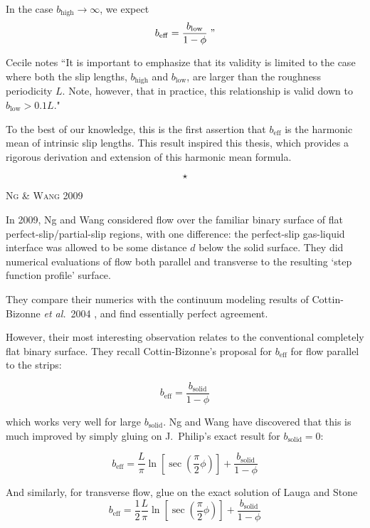 \documentclass[a4paper]{report}
\newcommand{\beff}{\ensuremath{b_{\mathrm{eff}}}}
\newcommand{\bhigh}{\ensuremath{b_{\mathrm{high}}}}
\newcommand{\blow}{\ensuremath{b_{\mathrm{low}}}}
\newcommand{\sep}{\begin{equation*} \star \end{equation*}}
\newcommand{\paper}[1]
         {\colorbox[gray]{0.8}{ \textsc{#1}}
         
         }
\begin{document}
In the case $b_{\mathrm{high}} \rightarrow \infty$, we expect
\begin{equation*}
\beff = \frac{b_{\mathrm{low}}}{1-\phi} \;"
\end{equation*}

Cecile notes ``It is important to emphasize that its validity is limited to the case where both the slip lengths, $\bhigh$ and $\blow$, are larger than the roughness periodicity $L$. Note, however, that in practice, this relationship is valid down to $\blow > 0.1L$."

To the best of our knowledge, this is the first assertion that $\beff$ is the harmonic mean of intrinsic slip lengths.  This result inspired this thesis, which provides a rigorous derivation and extension of this harmonic mean formula.

\sep

\paper{Ng \& Wang 2009}
In 2009, Ng and Wang \cite{NgWang2009} considered flow over the familiar binary surface of flat perfect-slip/partial-slip regions, with one difference: the perfect-slip gas-liquid interface was allowed to be some distance $d$ below the solid surface.  They did numerical evaluations of flow both parallel and transverse to the resulting `step function profile' surface.

They compare their numerics with the continuum modeling results of Cottin-Bizonne \emph{et al.}\ 2004 \cite{Cottin-Bizonne2004}, and find essentially perfect agreement.

However, their most interesting observation relates to the conventional completely flat binary surface.  They recall Cottin-Bizonne's proposal for $\beff$ for flow parallel to the strips:

\begin{equation*}
\beff = \frac{b_{\mathrm{solid}}}{1 - \phi}
\end{equation*}

which works very well for large $b_{\mathrm{solid}}$.  Ng and Wang have discovered that this is much improved by simply gluing on J.\ Philip's exact result \cite{Philip1972} for $b_{\mathrm{solid}}=0$:

\begin{equation*}
\beff =  \frac{L}{\pi} \ln \left[ \sec \left( \frac{\pi}{2} \phi \right) \right] +
 \frac{b_{\mathrm{solid}}}{1 - \phi}
\end{equation*}

And similarly, for transverse flow, glue on the exact solution of Lauga and Stone \cite{LaugaStone2003}
\begin{equation*}
\beff = \frac{1}{2}  \frac{L}{\pi} \ln \left[ \sec \left( \frac{\pi}{2} \phi \right) \right] +
 \frac{b_{\mathrm{solid}}}{1 - \phi}
\end{equation*}
\end{document}
